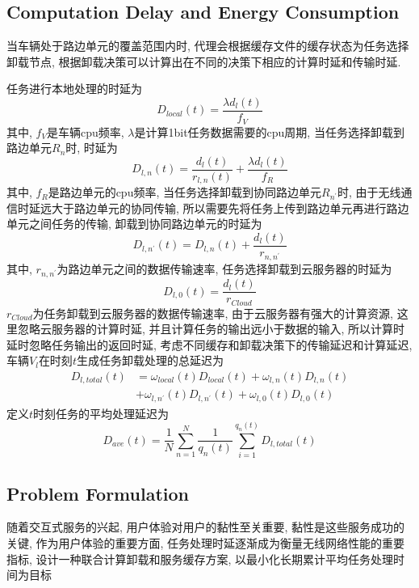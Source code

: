 \documentclass[lettersize,journal]{IEEEtran}
\begin{document}
{{\subsection{Computation Delay and Energy Consumption}
当车辆处于路边单元的覆盖范围内时, 代理会根据缓存文件的缓存状态为任务选择卸载节点, 根据卸载决策可以计算出在不同的决策下相应的计算时延和传输时延.

任务进行本地处理的时延为
\begin{equation}
	D_{local}(t) =  \frac{\lambda d_{l}(t)}{f_V}
	\label{l,m,delay}
\end{equation}
其中, $ f_V $是车辆cpu频率, $ \lambda $是计算1bit任务数据需要的cpu周期, 当任务选择卸载到路边单元$ R_n $时, 时延为
\begin{equation}
	D_{l,n}(t) = \frac{d_{l}(t)}{r_{l,n}(t)} + \frac{\lambda d_{l}(t)}{f_R}
	\label{l,n,delay}
\end{equation}
其中, $ f_R $是路边单元的cpu频率, 当任务选择卸载到协同路边单元$ R_{n^{\prime}} $时, 由于无线通信时延远大于路边单元的协同传输, 所以需要先将任务上传到路边单元再进行路边单元之间任务的传输, 卸载到协同路边单元的时延为
\begin{equation}
	D_{l,n^{\prime}}(t) = D_{l,n}(t)+\frac{d_l(t)}{r_{n,n^{\prime}}}
	\label{l,nprime,delay}
\end{equation}
其中, $ r_{n,n^{\prime}} $为路边单元之间的数据传输速率, 任务选择卸载到云服务器的时延为
\begin{equation}
		D_{l,0}(t) = \frac{d_{l}(t)}{r_{Cloud}}
		\label{l,0,delay}
\end{equation}
$ r_{Cloud} $为任务卸载到云服务器的数据传输速率, 由于云服务器有强大的计算资源, 这里忽略云服务器的计算时延, 并且计算任务的输出远小于数据的输入, 所以计算时延时忽略任务输出的返回时延, 考虑不同缓存和卸载决策下的传输延迟和计算延迟, 车辆$ V_l $在时刻$ t $生成任务卸载处理的总延迟为
\begin{equation}
	\begin{aligned}
		D_{l,total}(t) & = \omega_{local}(t)D_{local}(t) +\omega_{l,n}(t)D_{l,n}(t) \\   
		& +\omega_{l,n^{\prime}}(t)D_{l,n^{\prime}}(t) +\omega_{l,0}(t)D_{l,0}(t)
	\end{aligned}
\end{equation}
定义$ t $时刻任务的平均处理延迟为
\begin{equation}
		D_{ave}(t) = \frac{1}{N} \sum_{n=1}^{N} \frac{1}{q_n(t)} \sum_{i=1}^{q_n(t)} D_{l,total}(t)
\end{equation}

\subsection{Problem Formulation}
随着交互式服务的兴起, 用户体验对用户的黏性至关重要, 黏性是这些服务成功的关键, 作为用户体验的重要方面, 任务处理时延逐渐成为衡量无线网络性能的重要指标, 设计一种联合计算卸载和服务缓存方案, 以最小化长期累计平均任务处理时间为目标

}}
\end{document}
